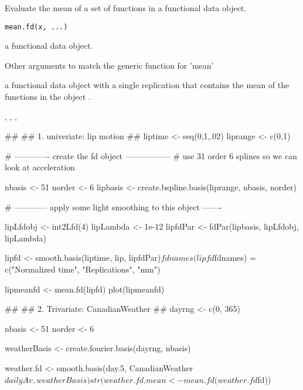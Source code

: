 \begin{Description}\relax
Evaluate the mean of a set of functions in a functional data object.
\end{Description}
\begin{Usage}
\begin{verbatim}
mean.fd(x, ...)
\end{verbatim}
\end{Usage}
\begin{Arguments}
\begin{ldescription}
\item[\code{x}] a functional data object.

\item[\code{...}] Other arguments to match the generic function for 'mean'
\end{ldescription}
\end{Arguments}
\begin{Value}
a functional data object with a single replication
that contains the mean of the functions in the object .
\end{Value}
\begin{SeeAlso}\relax
{}, 
, 
, 
\end{SeeAlso}
\begin{Examples}
\begin{ExampleCode}
##
## 1.  univeriate:  lip motion
##
liptime  <- seq(0,1,.02)
liprange <- c(0,1)

#  -------------  create the fd object -----------------
#       use 31 order 6 splines so we can look at acceleration

nbasis <- 51
norder <- 6
lipbasis <- create.bspline.basis(liprange, nbasis, norder)

#  ------------  apply some light smoothing to this object  -------

lipLfdobj   <- int2Lfd(4)
lipLambda   <- 1e-12
lipfdPar <- fdPar(lipbasis, lipLfdobj, lipLambda)

lipfd <- smooth.basis(liptime, lip, lipfdPar)$fd
names(lipfd$fdnames) = c("Normalized time", "Replications", "mm")

lipmeanfd <- mean.fd(lipfd)
plot(lipmeanfd)

##
## 2.  Trivariate:  CanadianWeather
##
dayrng <- c(0, 365) 

nbasis <- 51
norder <- 6 

weatherBasis <- create.fourier.basis(dayrng, nbasis)

weather.fd <- smooth.basis(day.5, CanadianWeather$dailyAv,
            weatherBasis)

str(weather.fd.mean <- mean.fd(weather.fd$fd))

\end{ExampleCode}
\end{Examples}

